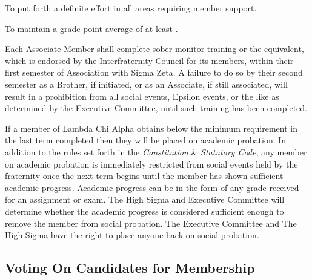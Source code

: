 \documentclass{article}
\begin{document}
\begin{subsubsectionList}
  \item To put forth a definite effort in all areas requiring member support.

  \item To maintain a grade point average of at least
  \minimumGradePointAverage. 

  \item Each Associate Member shall complete sober monitor training or the
  equivalent, which is endorsed by the Interfraternity Council for its members,
  within their first semester of Association with Sigma Zeta. A failure to do so
  by their second semester as a Brother, if initiated, or as an Associate, if
  still associated, will result in a prohibition from all social events, Epsilon
  events, or the like as determined by the Executive Committee, until such
  training has been completed.

  \item If a member of Lambda Chi Alpha obtains below the minimum 
  requirement in the last term completed then they will be placed on academic
  probation. In addition to the rules set forth in the \emph{Constitution} \&
  \emph{Statutory Code}, any member on academic probation is immediately
  restricted from social events held by the fraternity once the next term begins
  until the member has shown sufficient academic progress. Academic progress can
  be in the form of any grade received for an assignment or exam. The High Sigma
  and Executive Committee will determine whether the academic progress is
  considered sufficient enough to remove the member from social probation. The
  Executive Committee and The High Sigma have the right to place anyone back on
  social probation.
\end{subsubsectionList}

\subsection{Voting On Candidates for Membership}
\end{document}
